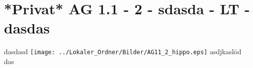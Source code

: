 \section{*Privat* AG 1.1 - 2 - sdasda - LT - dasdas}

\begin{beispiel}[AG 1.1]{1}
dasdasd
\texttt{[image: ../Lokaler\_Ordner/Bilder/AG11\_2\_hippo.eps]} asdjkaslöd
das

\end{beispiel}